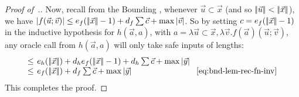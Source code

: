 \documentclass[manuscript,screen]{acmart}
\newcommand{\dfn}{:=}
\newcommand{\purple}[1]{{\color{purple}#1}}
\newcommand{\toappendix}[1]{\purple{#1}}
\newtheorem{prop}[thm]{Proposition}
\theoremstyle{definition}
\theoremstyle{remark}
\newcommand{\permpref}{\subset}
\newcommand{\sumlen}[1]{|\hspace{-.15em}|#1|\hspace{-.15em}|}
\newcommand{\bc}{\mathsf{B}}
\newcommand{\bcwfpo}[1]{\bc^{#1}}
\newcommand{\nested}{\mathsf{N}}
\newcommand{\nbcwfpo}[1]{\nested\bcwfpo{#1}}
\newcommand{\nbcpp}{\nbcwfpo{\permpref}}
\begin{document}
\begin{proof}[Proof of~.]
Now, recall from the Bounding , whenever $\vec u \permpref \vec x$ (and so $\sumlen{\vec u} < \sumlen{\vec x}$), we have $|f(\vec u;\vec v)| \leq e_f(\sumlen{\vec x}-1) + d_f\sum \vec c + \max |\vec v|$.
So by setting $c = e_f(\sumlen{\vec x}-1)$ in the inductive hypothesis for $h(\vec a,a)$, with $a = \lambda \vec u\permpref \vec x, \lambda \vec v. f(\vec a)(\vec u;\vec v)$, any oracle call from $h(\vec a,a)$ will only take safe inputs of lengths:
\[
\arraycolsep=2pt
\begin{array}{rlll}
    \leq & e_h(\sumlen{\vec x}) + d_h e_f(\sumlen{\vec x}-1) + d_h\sum \vec c + \max |\vec y| \\
    \leq & e_f(\sumlen{\vec x}) + d_f \sum \vec c + \max |\vec y| & & \text{\eqref{eq:bnd-lem-rec-fn-inv}}
\end{array}
\]
This completes the proof.  
\end{proof}









\end{document}
